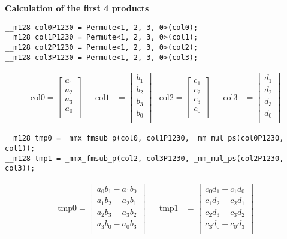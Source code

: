 \documentclass[fontsize = 10pt,DIV = 13]{scrartcl}
\begin{document}
\vspace{1cm}
\textbf{Calculation of the first 4 products}
\vspace{1cm}

\begin{verbatim}
__m128 col0P1230 = Permute<1, 2, 3, 0>(col0);
__m128 col1P1230 = Permute<1, 2, 3, 0>(col1);
__m128 col2P1230 = Permute<1, 2, 3, 0>(col2);
__m128 col3P1230 = Permute<1, 2, 3, 0>(col3);

\end{verbatim}

\begin{align*}
\mathrm{col0} 
=
\begin{bmatrix}
a_1\\
a_2\\
a_3\\
a_0\\
\end{bmatrix}
&&
\mathrm{col1} 
&=
\begin{bmatrix}
b_1\\
b_2\\
b_3\\
b_0\\
\end{bmatrix}
&
\mathrm{col2} 
=
\begin{bmatrix}
c_1\\
c_2\\
c_3\\
c_0\\
\end{bmatrix}
&&
\mathrm{col3} 
&=
\begin{bmatrix}
d_1\\
d_2\\
d_3\\
d_0\\
\end{bmatrix}
\end{align*}

\begin{verbatim}
__m128 tmp0 = _mmx_fmsub_p(col0, col1P1230, _mm_mul_ps(col0P1230, col1));
__m128 tmp1 = _mmx_fmsub_p(col2, col3P1230, _mm_mul_ps(col2P1230, col3));
\end{verbatim}


\begin{align*}
\mathrm{tmp0} 
=
\begin{bmatrix}
a_0b_1 - a_1b_0\\
a_1b_2 - a_2b_1\\
a_2b_3 - a_3b_2\\
a_3b_0 - a_0b_3\\
\end{bmatrix}
&&
\mathrm{tmp1} 
&=
\begin{bmatrix}
c_0d_1 - c_1d_0\\
c_1d_2 - c_2d_1\\
c_2d_3 - c_3d_2\\
c_3d_0 - c_0d_3\\
\end{bmatrix}
\end{align*}
\end{document}
